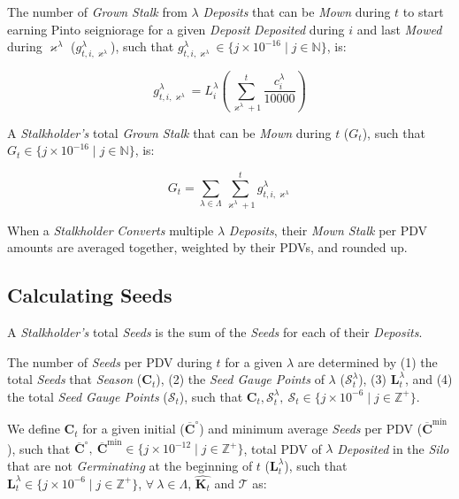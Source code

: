 \documentclass[tikz]{article}
\newcommand{\term}[1]{\textsl{#1}}
\begin{document}
The number of \term{Grown Stalk} from $\lambda$ \term{Deposits} that can be \term{Mown} during $t$ to start earning Pinto seigniorage for a given \term{Deposit} \term{Deposited} during $i$ and last \term{Mowed} during $\varkappa^{\lambda}$ ($g_{t,i,\varkappa^{\lambda}}^{\lambda}$), such that $g_{t,i,\varkappa^{\lambda}}^{\lambda} \in \{j \times 10^{-16} \mid j \in \mathbb{N} \}$, is:

    $$
        g_{t,i,\varkappa^{\lambda}}^{\lambda} = 
            L_{i}^{\lambda}\left
            (\sum_{\varkappa^{\lambda} + 1}^{t} 
                    \frac{c_{i}^{\lambda}}
                            {10000}
            \right)
    $$

A \term{Stalkholder's} total \term{Grown Stalk} that can be \term{Mown} during $t$ ($G_{t}$), such that $G_{t} \in \{j \times 10^{-16} \mid j \in \mathbb{N} \}$, is:

    $$
        G_{t} = 
            \sum_{\lambda \in \Lambda}
                \sum_{\varkappa^{\lambda} + 1}^{t} 
                    g_{t,i,\varkappa^{\lambda}}^{\lambda}
    $$

When a \term{Stalkholder} \term{Converts} multiple $\lambda$ \term{Deposits}, their \term{Mown Stalk} per PDV amounts are averaged together, weighted by their PDVs, and rounded up.


\vspace*{-1mm}
\subsection{Calculating Seeds}
\vspace*{-1mm}

A \term{Stalkholder's} total \term{Seeds} is the sum of the \term{Seeds} for each of their \term{Deposits}.

The number of \term{Seeds} per PDV during $t$ for a given $\lambda$ are determined by (1) the total \term{Seeds} that \term{Season} ($\mathbf{C}_{t}$), (2) the \term{Seed Gauge Points} of $\lambda$ ($\mathscr{S}_{t}^{\lambda}$), (3) $\mathbf{L}_{t}^{\lambda}$, and (4) the total \term{Seed Gauge Points} ($\mathscr{S}_{t}$), such that $\mathbf{C}_{t}, \mathscr{S}_{t}^{\lambda},\ \mathscr{S}_{t} \in \{j \times 10^{-6} \mid j \in \mathbb{Z}^{+} \}$.

We define $\mathbf{C}_{t}$ for a given initial ($\overline{\mathbf{C}}^{\circ}$) and minimum average \term{Seeds} per PDV ($\overline{\mathbf{C}}^{\text{min}}$), such that $\overline{\mathbf{C}}^{\circ},\ \overline{\mathbf{C}}^{\text{min}} \in \{j \times 10^{-12} \mid j \in \mathbb{Z}^{+} \}$, total PDV of $\lambda$ \term{Deposited} in the \term{Silo} that are not \term{Germinating} at the beginning of $t$ ($\mathbf{L}_{t}^{\lambda}$), such that $\mathbf{L}_{t}^{\lambda} \in \{j \times 10^{-6} \mid j \in \mathbb{Z}^{+} \}$, $\forall\ \lambda \in \Lambda$, $\widehat{\mathbf{K}_{t}}$ and $\mathscr{T}$ as: 
\end{document}
